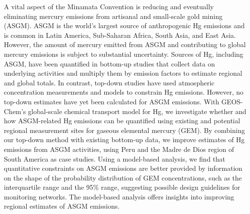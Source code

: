 % 
% 
%
A vital aspect of the Minamata Convention is reducing and eventually eliminating mercury emissions from artisanal and small-scale gold mining (ASGM). ASGM is the world's largest source of anthropogenic Hg emissions and is common in Latin America, Sub-Saharan Africa, South Asia, and East Asia. However, the amount of mercury emitted from ASGM and contributing to global mercury emissions is subject to substantial uncertainty. Sources of Hg, including ASGM, have been quantified in bottom-up studies that collect data on underlying activities and multiply them by emission factors to estimate regional and global totals. In contrast, top-down studies have used atmospheric concentration measurements and models to constrain Hg emissions. However, no top-down estimates have yet been calculated for ASGM emissions. With GEOS-Chem's global-scale chemical transport model for Hg, we investigate whether and how ASGM-related Hg emissions can be quantified using existing and potential regional measurement sites for gaseous elemental mercury (GEM). By combining our top-down method with existing bottom-up data, we improve estimates of Hg emissions from ASGM activities, using Peru and the Madre de Dios region of South America as case studies. Using a model-based analysis, we find that quantitative constraints on ASGM emissions are better provided by information on the shape of the probability distribution of GEM concentrations, such as the interquartile range and the 95\% range, suggesting possible design guidelines for monitoring networks. The model-based analysis offers insights into improving regional estimates of ASGM emissions.